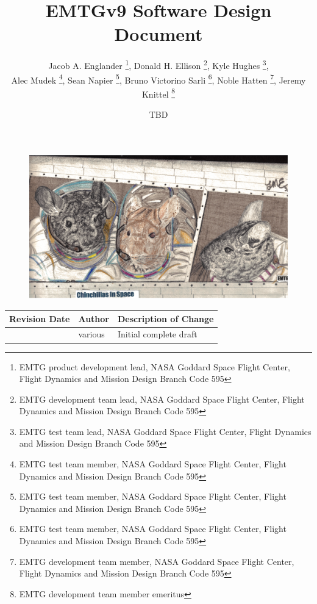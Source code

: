 \documentclass[11pt]{report}
\title{{\Huge EMTGv9 Software Design Document}}
\author
{	 
	Jacob A. Englander \thanks{EMTG product development lead, NASA Goddard Space Flight Center, Flight Dynamics and Mission Design Branch Code 595},
	Donald H. Ellison \thanks{EMTG development team lead, NASA Goddard Space Flight Center, Flight Dynamics and Mission Design Branch Code 595},
	Kyle Hughes \thanks{EMTG test team lead, NASA Goddard Space Flight Center, Flight Dynamics and Mission Design Branch Code 595},\\
	Alec Mudek \thanks{EMTG test team member, NASA Goddard Space Flight Center, Flight Dynamics and Mission Design Branch Code 595},
	Sean Napier \thanks{EMTG test team member, NASA Goddard Space Flight Center, Flight Dynamics and Mission Design Branch Code 595},
	Bruno Victorino Sarli \thanks{EMTG test team member, NASA Goddard Space Flight Center, Flight Dynamics and Mission Design Branch Code 595},
	Noble Hatten \thanks{EMTG development team member, NASA Goddard Space Flight Center, Flight Dynamics and Mission Design Branch Code 595},
	Jeremy Knittel \thanks{EMTG development team member emeritus}
}
\date{}
\begin{document}
\begin{titlepage}
\maketitle


\begin{figure}[H]
	\centering
	\includegraphics[width=0.75\linewidth]{splashchilla.PNG}
\end{figure}

\begin{table}[H]
	\centering
	\begin{tabular}{|l|l|l|}
		\hline
		\textbf{Revision Date} & \textbf{Author} & \textbf{Description of Change} \\ \hline
		\date{TBD} & various & Initial complete draft \\
		\hline
	\end{tabular}
\end{table}
\end{titlepage}



\tableofcontents
\clearpage
\listoffigures
\clearpage
\listoftables

\clearpage
\setcounter{page}{1}









































\end{document}
